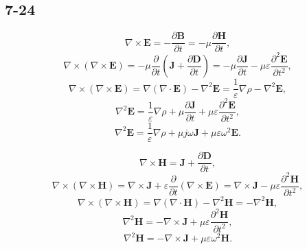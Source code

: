 \documentclass[11pt,a4paper]{article}
\author{\href{liuyh615@sjtu.edu.cn}{Yihao Liu} (515370910207)}
\subtitle{Homework}
\begin{document}
\maketitle

\subsection{7-24}
$$\nabla\times\mathbf{E}=-\frac{\partial\mathbf{B}}{\partial t}=-\mu\frac{\partial\mathbf{H}}{\partial t},$$
$$\nabla\times(\nabla\times\mathbf{E})=-\mu\frac{\partial}{\partial t}\left(\mathbf{J}+\frac{\partial\mathbf{D}}{\partial t}\right)=-\mu\frac{\partial\mathbf{J}}{\partial t}-\mu\varepsilon\frac{\partial^2\mathbf{E}}{\partial t^2},$$
$$\nabla\times(\nabla\times\mathbf{E})=\nabla(\nabla\cdot\mathbf{E})-\nabla^2\mathbf{E}=\frac{1}{\varepsilon}\nabla\rho-\nabla^2\mathbf{E},$$
$$\nabla^2\mathbf{E}=\frac{1}{\varepsilon}\nabla\rho+\mu\frac{\partial\mathbf{J}}{\partial t}+\mu\varepsilon\frac{\partial^2\mathbf{E}}{\partial t^2},$$
$$\nabla^2\mathbf{E}=\frac{1}{\varepsilon}\nabla\rho+\mu j\omega\mathbf{J}+\mu\varepsilon\omega^2\mathbf{E}.$$

$$\nabla\times\mathbf{H}=\mathbf{J}+\frac{\partial\mathbf{D}}{\partial t},$$
$$\nabla\times(\nabla\times\mathbf{H})=\nabla\times\mathbf{J}+\varepsilon\frac{\partial}{\partial t}(\nabla\times\mathbf{E})=\nabla\times\mathbf{J}-\mu\varepsilon\frac{\partial^2\mathbf{H}}{\partial t^2},$$
$$\nabla\times(\nabla\times\mathbf{H})=\nabla(\nabla\cdot\mathbf{H})-\nabla^2\mathbf{H}=-\nabla^2\mathbf{H},$$
$$\nabla^2\mathbf{H}=-\nabla\times\mathbf{J}+\mu\varepsilon\frac{\partial^2\mathbf{H}}{\partial t^2},$$
$$\nabla^2\mathbf{H}=-\nabla\times\mathbf{J}+\mu\varepsilon\omega^2\mathbf{H}.$$
\end{document}
